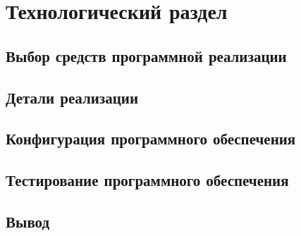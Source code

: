 \chapter{Технологический раздел}

\section{Выбор средств программной реализации}

\section{Детали реализации}

\section{Конфигурация программного обеспечения}

\section{Тестирование программного обеспечения}

\section*{Вывод}

